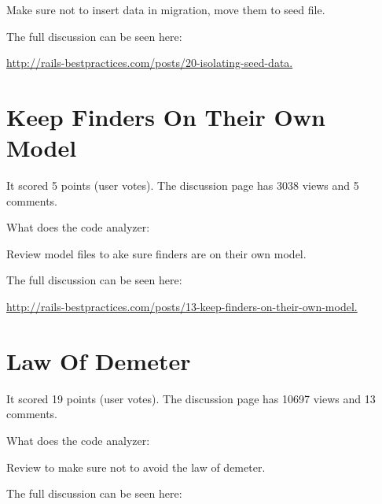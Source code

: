 Make sure not to insert data in migration, move them to seed file.

The full discussion can be seen here:
 
\url{http://rails-bestpractices.com/posts/20-isolating-seed-data.}

\section{Keep Finders On Their Own Model}


It scored 5 points (user votes). 
The discussion page has 3038 views and 5 comments.

What does the code analyzer:

Review model files to ake sure finders are on their own model.

The full discussion can be seen here:

\url{http://rails-bestpractices.com/posts/13-keep-finders-on-their-own-model.}

\section{Law Of Demeter }


It scored 19 points (user votes). 
The discussion page has 10697 views and 13 comments.

What does the code analyzer:

Review to make sure not to avoid the law of demeter.

The full discussion can be seen here:

